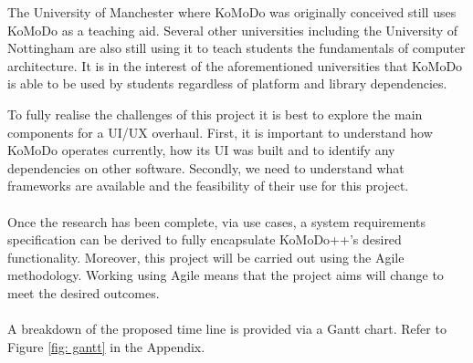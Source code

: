 The University of Manchester where KoMoDo was originally conceived still uses KoMoDo as a teaching aid. Several other universities including the University of Nottingham are also still using it to teach students the fundamentals of computer architecture. It is in the interest of the aforementioned universities that KoMoDo is able to be used by students regardless of platform and library dependencies.

To fully realise the challenges of this project it is best to explore the main components for a UI/UX overhaul. First, it is important to understand how KoMoDo operates currently, how its UI was built and to identify any dependencies on other software. Secondly, we need to understand what frameworks are available and the feasibility of their use for this project. \\\\
%
Once the research has been complete, via use cases, a system requirements specification can be derived to fully encapsulate KoMoDo++'s desired functionality. Moreover, this project will be carried out using the Agile methodology. Working using Agile means that the project aims will change to meet the desired outcomes.\\\\
%
A breakdown of the proposed time line is provided via a Gantt chart. Refer to Figure \ref{fig: gantt} in the Appendix.
